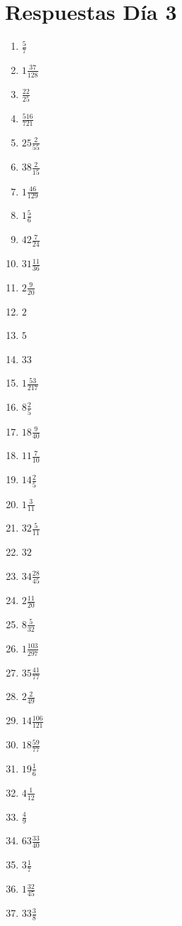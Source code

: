 \documentclass[12pt]{article}
\begin{document}
\section*{Respuestas Día 3}
\begin{enumerate}
\item $ \frac{5}{7} $
\item $ 1 \frac{37}{128} $
\item $ \frac{22}{25} $
\item $ \frac{516}{721} $
\item $ 25 \frac{2}{55} $
\item $ 38 \frac{2}{15} $
\item $ 1 \frac{46}{129} $
\item $ 1 \frac{5}{6} $
\item $ 42 \frac{7}{24} $
\item $ 31 \frac{11}{36} $
\item $ 2 \frac{9}{20} $
\item $ 2 $
\item $ 5 $
\item $ 33 $
\item $ 1 \frac{53}{217} $
\item $ 8 \frac{2}{5} $
\item $ 18 \frac{9}{40} $
\item $ 11 \frac{7}{10} $
\item $ 14 \frac{2}{5} $
\item $ 1 \frac{3}{11} $
\item $ 32 \frac{5}{11} $
\item $ 32 $
\item $ 34 \frac{28}{45} $
\item $ 2 \frac{11}{20} $
\item $ 8 \frac{5}{32} $
\item $ 1 \frac{103}{297} $
\item $ 35 \frac{41}{77} $
\item $ 2 \frac{2}{49} $
\item $ 14 \frac{106}{121} $
\item $ 18 \frac{59}{77} $
\item $ 19 \frac{1}{6} $
\item $ 4 \frac{1}{12} $
\item $ \frac{4}{9} $
\item $ 63 \frac{33}{40} $
\item $ 3 \frac{1}{7} $
\item $ 1 \frac{32}{45} $
\item $ 33 \frac{3}{8} $

\end{enumerate}
\end{document}
